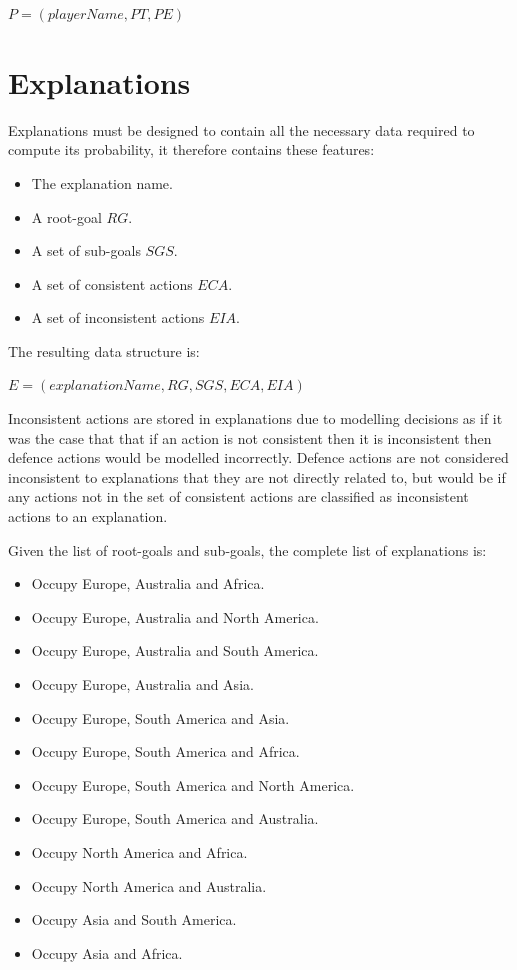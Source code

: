 \documentclass[parskip]{cs4rep}
\begin{document}
\centerline{
$P = ( playerName, PT, PE )$
}

\section{Explanations}

Explanations must be designed to contain all the necessary data required to compute its probability, it therefore contains these features:

\begin{itemize}
\item
The explanation name.
\item
A root-goal $RG$.
\item
A set of sub-goals $SGS$.
\item
A set of consistent actions $ECA$.
\item
A set of inconsistent actions $EIA$.
\end{itemize}

The resulting data structure is:\newline

\centerline{
$E = ( explanationName, RG, SGS, ECA, EIA )$
}

Inconsistent actions are stored in explanations due to modelling decisions as if it was the case that that if an action is not consistent then it is inconsistent then defence actions would be modelled incorrectly. Defence actions are not considered inconsistent to explanations that they are not directly related to, but would be if any actions not in the set of consistent actions are classified as inconsistent actions to an explanation.

Given the list of root-goals and sub-goals, the complete list of explanations is:

\begin{itemize}
\item
Occupy Europe, Australia and Africa.
\item
Occupy Europe, Australia and North America.
\item
Occupy Europe, Australia and South America.
\item
Occupy Europe, Australia and Asia.
\item
Occupy Europe, South America and Asia.
\item
Occupy Europe, South America and Africa.
\item
Occupy Europe, South America and North America.
\item
Occupy Europe, South America and Australia.
\item
Occupy North America and Africa.
\item
Occupy North America and Australia.
\item
Occupy Asia and South America.
\item
Occupy Asia and Africa.
\end{itemize}
\end{document}
